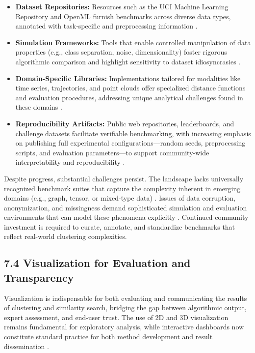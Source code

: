 \documentclass[11pt]{article}
\begin{document}
\begin{itemize}
    \item \textbf{Dataset Repositories:} Resources such as the UCI Machine Learning Repository and OpenML furnish benchmarks across diverse data types, annotated with task-specific and preprocessing information \cite{ref14,ref80,ref81,ref87,ref92,ref93}.
    \item \textbf{Simulation Frameworks:} Tools that enable controlled manipulation of data properties (e.g., class separation, noise, dimensionality) foster rigorous algorithmic comparison and highlight sensitivity to dataset idiosyncrasies \cite{ref33,ref99,ref100,ref110}.
    \item \textbf{Domain-Specific Libraries:} Implementations tailored for modalities like time series, trajectories, and point clouds offer specialized distance functions and evaluation procedures, addressing unique analytical challenges found in these domains \cite{ref75,ref92,ref93,ref94}.
    \item \textbf{Reproducibility Artifacts:} Public web repositories, leaderboards, and challenge datasets facilitate verifiable benchmarking, with increasing emphasis on publishing full experimental configurations—random seeds, preprocessing scripts, and evaluation parameters—to support community-wide interpretability and reproducibility \cite{ref14,ref44,ref64,ref80,ref81,ref91,ref95,ref99}.
\end{itemize}

Despite progress, substantial challenges persist. The landscape lacks universally recognized benchmark suites that capture the complexity inherent in emerging domains (e.g., graph, tensor, or mixed-type data) \cite{ref27,ref28,ref36,ref46,ref110}. Issues of data corruption, anonymization, and missingness demand sophisticated simulation and evaluation environments that can model these phenomena explicitly \cite{ref94,ref95,ref96,ref99}. Continued community investment is required to curate, annotate, and standardize benchmarks that reflect real-world clustering complexities.

\subsection{7.4 Visualization for Evaluation and Transparency}

Visualization is indispensable for both evaluating and communicating the results of clustering and similarity search, bridging the gap between algorithmic output, expert assessment, and end-user trust. The use of 2D and 3D visualization remains fundamental for exploratory analysis, while interactive dashboards now constitute standard practice for both method development and result dissemination \cite{ref53,ref58,ref79,ref86,ref91,ref92,ref94,ref95,ref99,ref115}.
\end{document}

